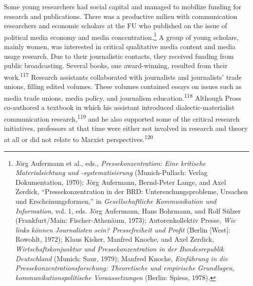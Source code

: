 \documentclass{tufte-handout}
\begin{document}
Some young researchers had social capital and managed to mobilize
funding for research and publications. There was a productive milieu
with communication researchers and economic scholars at the FU who
published on the issue of political media economy and media
concentration.\footnote{Jörg Aufermann et al., eds.,
  \emph{Pressekonzentration: Eine kritische Materialsichtung und
  -systematisierung} (Munich-Pullach: Verlag Dokumentation, 1970); Jörg
  Aufermann, Bernd-Peter Lange, and Axel Zerdick, ``Pressekonzentration
  in der BRD: Untersuchungsprobleme, Ursachen und Erscheinungsformen,''
  in \emph{Gesellschaftliche Kommunikation und Information}, vol. 1,
  eds. Jörg Aufermann, Hans Bohrmann, and Rolf Sülzer (Frankfurt/Main:
  Fischer-Athenäum, 1973); Autorenkollektiv Presse, \emph{Wie links
  können Journalisten sein? Pressefreiheit und Profit} (Berlin
  {[}West{]}: Rowohlt, 1972); Klaus Kisker, Manfred Knoche, and Axel
  Zerdick, \emph{Wirtschaftskonjunktur und Pressekonzentration in der
  Bundesrepublik Deutschland} (Munich: Saur, 1979); Manfred Knoche,
  \emph{Einführung in die Pressekonzentrationsforschung: Theoretische
  und empirische Grundlagen, kommunikationspolitische Voraussetzungen}
  (Berlin: Spiess, 1978).} A group of young scholars, mainly women, was
interested in critical qualitative media content and media usage
research. Due to their journalistic contacts, they received funding from
public broadcasting. Several books, one award-winning, resulted from
their work.\textsuperscript{117} Research
assistants collaborated with journalists and journalists' trade unions,
filling edited volumes. These volumes contained essays on issues such as
media trade unions, media policy, and journalism education.\textsuperscript{118} Although Pross co-authored a textbook in which
his assistant introduced dialectic-materialist communication
research,\textsuperscript{119} and he
also supported some of the critical research initiatives, professors at
that time were either not involved in research and theory at all or did
not relate to Marxist perspectives.\textsuperscript{120}
\end{document}
